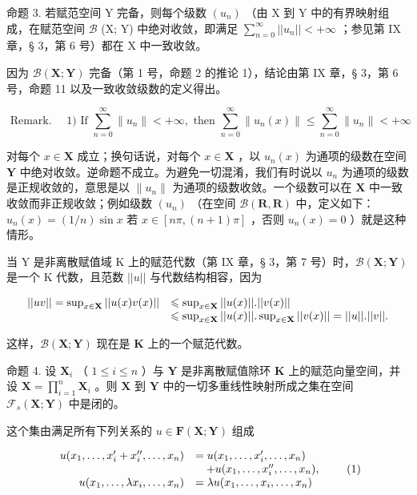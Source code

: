 命题 3. 若赋范空间 Y 完备，则每个级数 \((u_n)\) （由 X 到 Y 中的有界映射组成，在赋范空间 \(\mathcal{B}\) (X; Y) 中绝对收敛，即满足 \(\sum_{n=0}^{\infty}||u_n|| < +\infty\) ；参见第 IX 章，§ 3，第 6 号）都在 X 中一致收敛。

因为 \(\mathcal{B}(\mathbf{X};\mathbf{Y})\) 完备（第 1 号，命题 2 的推论 1），结论由第 IX 章，§ 3，第 6 号，命题 11 以及一致收敛级数的定义得出。

\[
\text { Remark. } \quad 1) \text {   If   } \sum_ {n = 0} ^ {\infty} \| u _ {n} \| <   + \infty , \text {   then   } \sum_ {n = 0} ^ {\infty} \| u _ {n} (x) \| \leqslant \sum_ {n = 0} ^ {\infty} \| u _ {n} \| <   + \infty
\]

对每个 \(x \in \mathbf{X}\) 成立；换句话说，对每个 \(x \in \mathbf{X}\) ，以 \(u_n(x)\) 为通项的级数在空间 \(\mathbf{Y}\) 中绝对收敛。逆命题不成立。为避免一切混淆，我们有时说以 \(u_n\) 为通项的级数是正规收敛的，意思是以 \(\| u_n \|\) 为通项的级数收敛。一个级数可以在 \(\mathbf{X}\) 中一致收敛而非正规收敛；例如级数 \((u_n)\) （在空间 \(\mathcal{B}(\mathbf{R}, \mathbf{R})\) 中，定义如下：\(u_n(x) = (1/n) \sin x\) 若 \(x \in [n\pi, (n + 1)\pi]\) ，否则 \(u_n(x) = 0\) ）就是这种情形。

当 Y 是非离散赋值域 K 上的赋范代数（第 IX 章，§ 3，第 7 号）时，\(\mathcal{B}(\mathbf{X};\mathbf{Y})\) 是一个 K 代数，且范数 \(||u||\) 与代数结构相容，因为

\[
\begin{array}{r l} | | u v | | = \sup _ {x \in \mathbf {X}} | | u (x) v (x) | | & \leqslant \sup _ {x \in \mathbf {X}} | | u (x) | |. | | v (x) | | \\ & \leqslant \sup _ {x \in \mathbf {X}} | | u (x) | |. \sup _ {x \in \mathbf {X}} | | v (x) | | = | | u | |. | | v | |. \end{array}
\]

这样，\(\mathcal{B}(\mathbf{X};\mathbf{Y})\) 现在是 \(\mathbf{K}\) 上的一个赋范代数。

命题 4. 设 \(\mathbf{X}_i\) （ \(1 \leqslant i \leqslant n\) ）与 \(\mathbf{Y}\) 是非离散赋值除环 \(\mathbf{K}\) 上的赋范向量空间，并设 \(\mathbf{X} = \prod_{i=1}^{n} \mathbf{X}_i\) 。则 \(\mathbf{X}\) 到 \(\mathbf{Y}\) 中的一切多重线性映射所成之集在空间 \(\mathcal{F}_s(\mathbf{X}; \mathbf{Y})\) 中是闭的。

这个集由满足所有下列关系的 \(u \in \mathbf{F}(\mathbf{X};\mathbf{Y})\) 组成

\[
\begin{array}{r l} u (x _ {1}, \dots , x _ {i} ^ {\prime} + x _ {i} ^ {\prime \prime}, \dots , x _ {n}) & = u (x _ {1}, \dots , x _ {i} ^ {\prime}, \dots , x _ {n}) \\ & \quad + u (x _ {1}, \dots , x _ {i} ^ {\prime \prime}, \dots , x _ {n}), \\ u (x _ {1}, \dots , \lambda x _ {i}, \dots , x _ {n}) & = \lambda u (x _ {1}, \dots , x _ {i}, \dots , x _ {n}) \end{array}\tag{1}
\]

